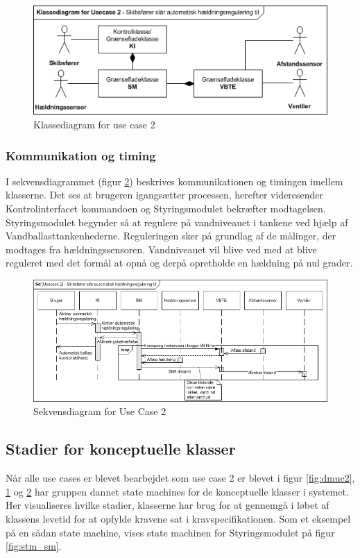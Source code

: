 \begin{figure}[H]
\centering
\includegraphics[scale=0.8]{billeder/Systemarkitektur/KD_UC2}
\caption{Klassediagram for use case 2}
\label{fig:kduc2}
\end{figure}


\subsubsection{Kommunikation og timing}
I sekvensdiagrammet (figur \ref{fig:sduc2}) beskrives kommunikationen og timingen imellem klasserne. Det ses at brugeren igangsætter processen, herefter videresender Kontrolinterfacet kommandoen og Styringsmodulet bekræfter modtagelsen. Styringsmodulet begynder så at regulere på vandniveauet i tankene ved hjælp af Vandballasttankenhederne. Reguleringen sker på grundlag af de målinger, der modtages fra hældningssensoren. Vandniveauet vil blive ved med at blive reguleret med det formål at opnå og derpå opretholde en hældning på nul grader.

\begin{figure}[H]
\centering
\includegraphics[scale=0.8]{billeder/Systemarkitektur/SD_UC2}
\caption{Sekvensdiagram for Use Case 2}
\label{fig:sduc2}
\end{figure}

\subsection{Stadier for konceptuelle klasser}
Når alle use cases er blevet bearbejdet som use case 2 er blevet i figur \ref{fig:dmuc2}, \ref{fig:kduc2} og \ref{fig:sduc2} har gruppen dannet state machines for de konceptuelle klasser i systemet. Her visualiseres hvilke stadier, klasserne har brug for at gennemgå i løbet af klassens levetid for at opfylde kravene sat i kravspecifikationen. Som et eksempel på en sådan state machine, vises state machinen for Styringsmodulet på figur \ref{fig:stm_sm}. \\

